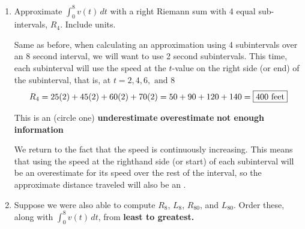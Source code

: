 \documentclass{article}
\begin{document}
\begin{enumerate}
\begin{enumerate}
\begin{solution}
When calculating an approximation using 4 subintervals over an 8 second interval, we will want to use 2 second subintervals. Each subinterval will use the speed at the $t$-value on the left side of the subinterval, that is, at $t=0, 2, 4, \text{ and } 6$
    \[
    L_4= 0(2)+25(2)+45(2)+60(2) = 50+90+120=\fbox{$260 \text{ feet}$}
    \]
\end{solution}
        This is an (circle one) \hfill \textbf{underestimate} \hfill \textbf{overestimate} \hfill \textbf{not enough information} \hfill

        \begin{solution} 
        We are told in the problem prompt that the speed is continuously increasing. This means that using the speed at the lefthand side (or start) of each subinterval will be an underestimate for its speed over the rest of the interval, so the approximate distance traveled will also be an .
        \end{solution} 
        
        \item 
        \begin{problem}
            Approximate $\displaystyle \int_0^8 v(t)\,dt$ with a right Riemann sum with 4 equal sub-intervals, $R_4$. Include units.
        \end{problem}
        \pspace{\vfill}
        \begin{solution}
            Same as before, when calculating an approximation using 4 subintervals over an 8 second interval, we will want to use 2 second subintervals. This time, each subinterval will use the speed at the $t$-value on the right side (or end) of the subinterval, that is, at $t= 2, 4, 6,\text{ and } 8$
    \[
    R_4= 25(2)+45(2)+60(2) + 70(2) = 50+90+120 + 140=\fbox{$400 \text{ feet}$}
    \]
        \end{solution}

        This is an (circle one) \hfill \textbf{underestimate} \hfill \textbf{overestimate} \hfill \textbf{not enough information} \hfill

\begin{solution}
    We return to the fact that the speed is continuously increasing. This means that using the speed at the righthand side (or start) of each subinterval will be an overestimate for its speed over the rest of the interval, so the approximate distance traveled will also be an .
\end{solution}
        \item 
\begin{problem}
Suppose we were also able to compute $R_{8}$, $L_{8}$, $R_{80}$, and $L_{80}$. Order these, along with  $\displaystyle\int_0^{8} v(t)\,dt$, from \textbf{least to greatest.}
\end{problem}


\end{enumerate}
\end{enumerate}
\end{document}
